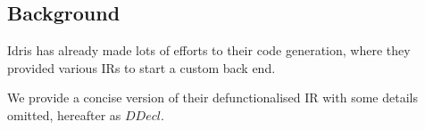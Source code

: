 \documentclass[a1,portrait]{a1poster}
\begin{document}
\begin{multicols}{2}

\section*{Background}

Idris has already made lots of efforts to their code generation, where
they provided various IRs \cite{brady2015cross} to start a custom back end.

We provide a concise version of their defunctionalised IR with some details omitted, hereafter as $DDecl$.

\vspace{-1cm}

\begin{multicols}{2}

\begin{minipage}[b]{0.8\linewidth}
\begin{bnf*}
    \\
    \\
    \\
    \\
    \\
    \\
    \\
    \\
    \\
    \\
    \\
    \\
\end{bnf*}
\end{minipage}


\end{multicols}
\end{multicols}
\end{document}

